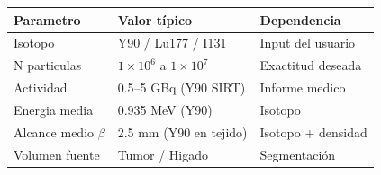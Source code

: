 \documentclass[12pt,a4paper]{article}
\begin{document}
\begin{center}
\begin{tabular}{lll}
\toprule
\textbf{Parametro} & \textbf{Valor típico} & \textbf{Dependencia} \\
\midrule
Isotopo & Y90 / Lu177 / I131 & Input del usuario \\
N particulas & $1\times10^6$ a $1\times10^7$ & Exactitud deseada \\
Actividad & 0.5--5 GBq (Y90 SIRT) & Informe medico \\
Energia media & 0.935 MeV (Y90) & Isotopo \\
Alcance medio $\beta$ & 2.5 mm (Y90 en tejido) & Isotopo + densidad \\
Volumen fuente & Tumor / Higado & Segmentación \\
\bottomrule
\end{tabular}
\end{center}
\end{document}
